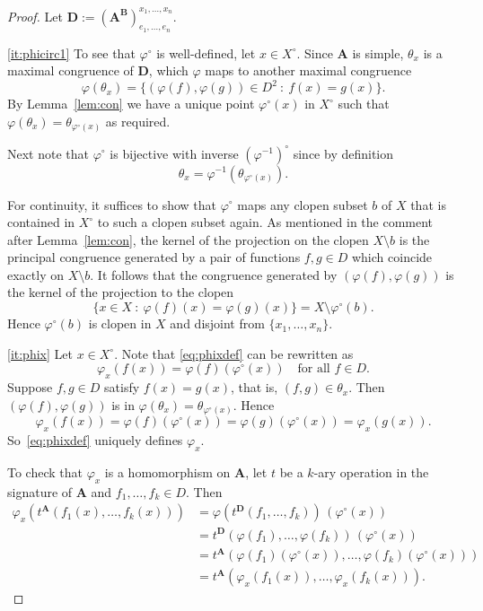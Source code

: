 \documentclass[12pt,a4paper,reqno]{amsart}
\numberwithin{equation}{section}
\theoremstyle{plain}
\theoremstyle{definition}
\newcommand{\A}{\mathbf{A}}
\newcommand{\ABxe}{(\mathbf{A^B})^{x_1,\dots,x_n}_{e_1,\dots,e_n}}
\newcommand{\D}{\mathbf{D}}
\newcommand{\st}{\: :\:}
\begin{document}
\begin{proof}
 Let $\D := \ABxe$.
  
\eqref{it:phicirc1}
 To see that $\varphi^\circ$ is well-defined, let $x\in X^\circ$.
 Since  $\A$ is simple, $\theta_x$ is a maximal congruence of $\D$, which $\varphi$ maps to another maximal congruence
\[ \varphi(\theta_x) = \{ (\varphi(f),\varphi(g))\in D^2 \st f(x)=g(x) \}. \]
 By Lemma~\ref{lem:con} we have a unique point $\varphi^\circ(x)$ in $X^\circ$ such that
 $\varphi(\theta_x) = \theta_{\varphi^\circ(x)}$ as required.
 
 Next note that $\varphi^\circ$ is bijective with inverse $(\varphi^{-1})^\circ$ since by
 definition
\[ \theta_x = \varphi^{-1}(\theta_{\varphi^\circ(x)}). \]

 For continuity, it suffices to show that $\varphi^\circ$ maps any clopen subset $b$ of $X$ that is contained in $X^\circ$
 to such a clopen subset again.
 As mentioned in the comment after Lemma~\ref{lem:con}, the kernel of the projection on the clopen
  $X\setminus b$ is the principal congruence generated by a pair of functions $f,g\in D$ which coincide exactly on
  $X\setminus b$.
It follows that the congruence generated by $(\varphi(f),\varphi(g))$ is the kernel of the projection to the clopen
\[ \{x\in X \st \varphi(f)(x)=\varphi(g)(x) \} = X\setminus\varphi^\circ(b). \]
 Hence $\varphi^\circ(b)$ is clopen in $X$ and disjoint from $\{x_1,\dots,x_n\}$.

 \eqref{it:phix}
 Let $x\in X^\circ$.
Note that \eqref{eq:phixdef} can be rewritten as
\[
\varphi_x(f(x)) = \varphi(f)(\varphi^\circ(x))\quad\text{for all } f\in D.
\] 
 Suppose $f,g\in D$ satisfy $f(x) = g(x)$, that is, $(f,g)\in\theta_x$.
 Then $(\varphi(f),\varphi(g))$ is in $\varphi(\theta_x) = \theta_{\varphi^\circ(x)}$.
 Hence
\[ \varphi_x(f(x)) = \varphi(f)(\varphi^\circ(x)) = \varphi(g)(\varphi^\circ(x)) = \varphi_x(g(x)). \]
 So~\eqref{eq:phixdef} uniquely defines $\varphi_x$.

To check that $\varphi_x$ is a homomorphism on $\A$, let $t$ be a $k$-ary operation in the signature of $\A$ and
$f_1,\dots,f_k\in D$. Then
\begin{align*}
  \varphi_x(t^\A(f_1(x),\dots,f_k(x))) & = \varphi(t^\D(f_1,\dots,f_k))\, (\varphi^\circ(x)) \\
                                        &  = t^\D( \varphi(f_1),\dots, \varphi(f_k))\, (\varphi^\circ(x))\\
                                      &  = t^\A( \varphi(f_1)(\varphi^\circ(x)),\dots,\varphi(f_k)(\varphi^\circ(x)) ) \\
  & = t^\A( \varphi_x(f_1(x)),\dots,\varphi_x(f_k(x))).
\end{align*}


\end{proof}
\end{document}
